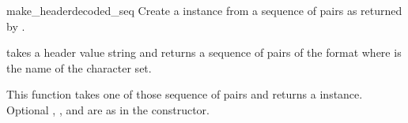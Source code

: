 \begin{funcdesc}{make_header}{decoded_seq}
Create a  instance from a sequence of pairs as returned
by .

 takes a header value string and returns a
sequence of pairs of the format  where
 is the name of the character set.

This function takes one of those sequence of pairs and returns a
 instance.  Optional ,
, and  are as in the
 constructor.
\end{funcdesc}

